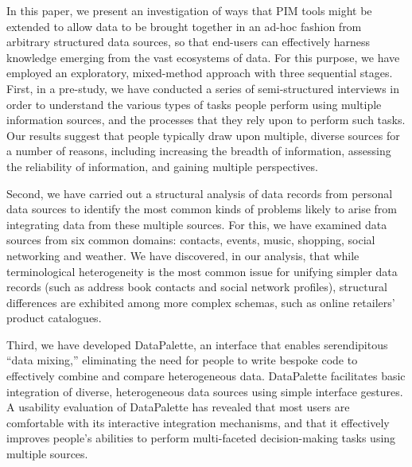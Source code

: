 \documentclass{sigchi}
\begin{document}
In this paper, we present an investigation of ways that PIM tools might be extended to allow data to be brought together in an ad-hoc fashion from arbitrary structured data sources, so that end-users can effectively harness knowledge emerging from the vast ecosystems of data.  For this purpose, we have employed an exploratory, mixed-method approach with three sequential stages. First, in a pre-study, we have conducted a series of semi-structured interviews in order to understand the various types of tasks people perform using multiple information sources, and the processes that they rely upon to perform such tasks.  Our results suggest that people typically draw upon multiple, diverse sources for a number of reasons, including increasing the breadth of information, assessing the reliability of information, and gaining multiple perspectives.  


Second, we have carried out a structural analysis of data records from personal data sources to identify the most common kinds of problems likely to arise from integrating data from these multiple sources.  For this, we have examined data sources from six common domains: contacts, events, music, shopping, social networking and weather. We have discovered, in our analysis, that while terminological heterogeneity is the most common issue for unifying simpler data records (such as address book contacts and social network profiles), structural differences are exhibited among more complex schemas, such as online retailers' product catalogues.

Third, we have developed DataPalette, an interface that enables serendipitous ``data mixing,'' eliminating the need for people to write bespoke code to effectively combine and compare heterogeneous data.  DataPalette facilitates basic integration of diverse, heterogeneous data sources using simple interface gestures.  A usability evaluation of DataPalette has revealed that most users are comfortable with its interactive integration mechanisms, and that it effectively improves people's abilities to perform multi-faceted decision-making tasks using multiple sources.
\end{document}

